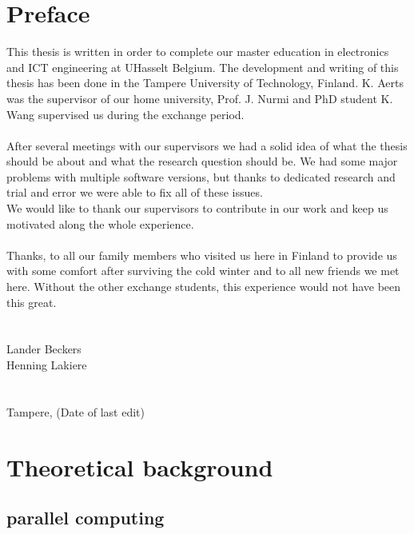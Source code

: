 \documentclass[a4paper, 11pt]{report}
\begin{document}
\chapter*{Preface}

This thesis is written in order to complete our master education in electronics and ICT engineering at UHasselt Belgium. The development and writing of this thesis has been done in the Tampere University of Technology, Finland. K. Aerts was the supervisor of our home university, Prof. J. Nurmi and PhD student K. Wang supervised us during the exchange period. \\\\
After several meetings with our supervisors we had a solid idea of what the thesis should be about and what the research question should be. We had some major problems with multiple software versions,  but thanks to dedicated research and trial and error we were able to fix all of these issues.\\
We would like to thank our supervisors to contribute in our work and keep us motivated along the whole experience.\\\\
Thanks, to all our family members who visited us here in Finland to provide us with some comfort after surviving the cold winter and to all new friends we met here. Without the other exchange students, this experience would not have been this great.\\\\\\
Lander Beckers\\
Henning Lakiere\\\\\\
Tampere, (Date of last edit)


\chapter{Theoretical background}

\section{parallel computing}
\end{document}
